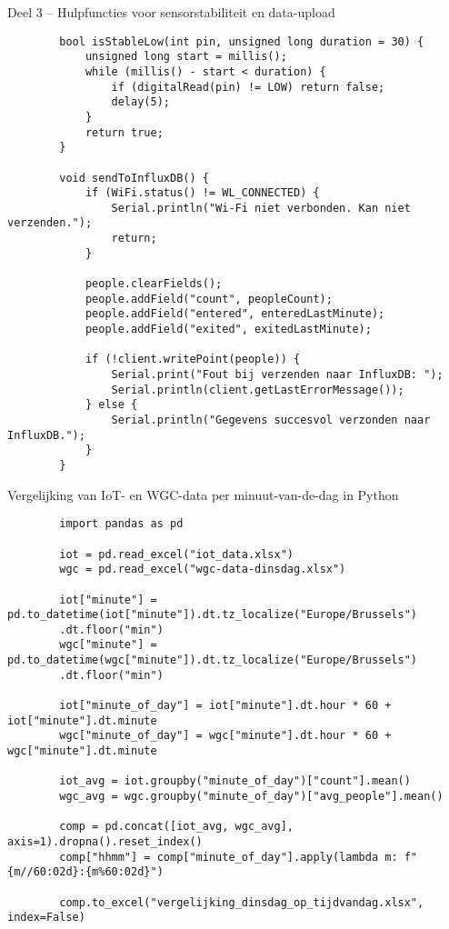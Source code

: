 \documentclass[dutch,dit,thesis]{hogentreport}
\begin{document}
\begin{listing}[H]
    \caption{Deel 3 – Hulpfuncties voor sensorstabiliteit en data-upload}
    \label{lst:esp32_utils}
    \begin{verbatim}
        bool isStableLow(int pin, unsigned long duration = 30) {
            unsigned long start = millis();
            while (millis() - start < duration) {
                if (digitalRead(pin) != LOW) return false;
                delay(5);
            }
            return true;
        }
        
        void sendToInfluxDB() {
            if (WiFi.status() != WL_CONNECTED) {
                Serial.println("Wi-Fi niet verbonden. Kan niet verzenden.");
                return;
            }
            
            people.clearFields();
            people.addField("count", peopleCount);
            people.addField("entered", enteredLastMinute);
            people.addField("exited", exitedLastMinute);
            
            if (!client.writePoint(people)) {
                Serial.print("Fout bij verzenden naar InfluxDB: ");
                Serial.println(client.getLastErrorMessage());
            } else {
                Serial.println("Gegevens succesvol verzonden naar InfluxDB.");
            }
        }
    \end{verbatim}
\end{listing}

\begin{listing}[H]
    \caption{Vergelijking van IoT- en WGC-data per minuut-van-de-dag in Python}
    \label{lst:python-iot-wgc}
    \begin{verbatim}
        import pandas as pd
        
        iot = pd.read_excel("iot_data.xlsx")
        wgc = pd.read_excel("wgc-data-dinsdag.xlsx")
        
        iot["minute"] = pd.to_datetime(iot["minute"]).dt.tz_localize("Europe/Brussels")
        .dt.floor("min")
        wgc["minute"] = pd.to_datetime(wgc["minute"]).dt.tz_localize("Europe/Brussels")
        .dt.floor("min")
        
        iot["minute_of_day"] = iot["minute"].dt.hour * 60 + iot["minute"].dt.minute
        wgc["minute_of_day"] = wgc["minute"].dt.hour * 60 + wgc["minute"].dt.minute
        
        iot_avg = iot.groupby("minute_of_day")["count"].mean()
        wgc_avg = wgc.groupby("minute_of_day")["avg_people"].mean()
        
        comp = pd.concat([iot_avg, wgc_avg], axis=1).dropna().reset_index()
        comp["hhmm"] = comp["minute_of_day"].apply(lambda m: f"{m//60:02d}:{m%60:02d}")
        
        comp.to_excel("vergelijking_dinsdag_op_tijdvandag.xlsx", index=False)
    \end{verbatim}
\end{listing}
\end{document}
